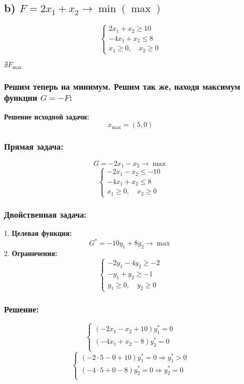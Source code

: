 \documentclass[17pt]{extarticle}
\begin{document}
\subsection*{b) \( F = 2x_1 + x_2 \to \min (\max) \)}

\[
    \begin{cases}
        2x_1 + x_2 \geq 10 \\
        -4x_1 + x_2 \leq 8 \\
        x_1 \geq 0, \quad x_2 \geq 0
    \end{cases}
\]

\(\nexists F_{\text{max}}\)

\subsubsection*{Решим теперь на минимум. Решим так же, находя максимум функции \( G = -F \):}

\textbf{Решение исходной задачи:}
\[
    x_{\text{max}} = (5, 0)
\]

\subsubsection*{Прямая задача:}
\[
    G = -2x_1 - x_2 \to \max
\]
\[
    \begin{cases}
        -2x_1 - x_2 \leq -10 \\
        -4x_1 + x_2 \leq 8   \\
        x_1 \geq 0, \quad x_2 \geq 0
    \end{cases}
\]

\subsubsection*{Двойственная задача:}
1. \textbf{Целевая функция:}
\[
    G^* = -10y_1 + 8y_2 \to \max
\]
2. \textbf{Ограничения:}
\[
    \begin{cases}
        -2y_1 - 4y_2 \geq -2 \\
        -y_1 + y_2 \geq -1   \\
        y_1 \geq 0, \quad y_2 \geq 0
    \end{cases}
\]

\subsubsection*{Решение:}
\[
    \begin{cases}
        (-2x_1 - x_2 + 10)y_1^* = 0 \\
        (-4x_1 + x_2 - 8)y_2^* = 0  \\
    \end{cases}
\]
\[
    \begin{cases}
        (-2 \cdot 5 - 0 + 10)y_1^* = 0 \Rightarrow y_1^* > 0 \\
        (-4 \cdot 5 + 0 - 8)y_2^* = 0 \Rightarrow y_2^* = 0  \\
    \end{cases}
\]
\end{document}
